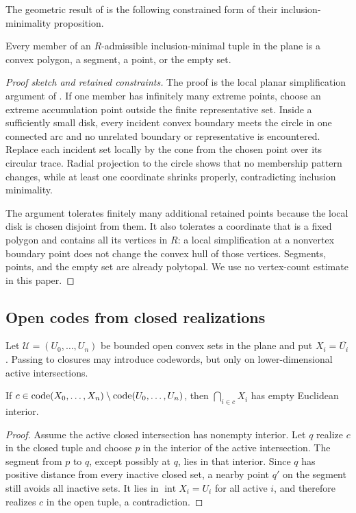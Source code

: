 The geometric result of \citet{BukhJeffs2023} is the following constrained
form of their inclusion-minimality proposition.

\begin{lemma}\label{lem:polygonal}
Every member of an $R$-admissible inclusion-minimal tuple in the plane is a
convex polygon, a segment, a point, or the empty set.
\end{lemma}

\begin{proof}[Proof sketch and retained constraints]
The proof is the local planar simplification argument of
\citet{BukhJeffs2023}.  If one member has infinitely many extreme points,
choose an extreme accumulation point outside the finite representative set.
Inside a sufficiently small disk, every incident convex boundary meets the
circle in one connected arc and no unrelated boundary or representative is
encountered.  Replace each incident set locally by the cone from the chosen
point over its circular trace.  Radial projection to the circle shows that
no membership pattern changes, while at least one coordinate shrinks
properly, contradicting inclusion minimality.

The argument tolerates finitely many additional retained points because the
local disk is chosen disjoint from them.  It also tolerates a coordinate
that is a fixed polygon and contains all its vertices in $R$: a local
simplification at a nonvertex boundary point does not change the convex hull
of those vertices.  Segments, points, and the empty set are already
polytopal.  We use no vertex-count estimate in this paper.
\end{proof}

\subsection{Open codes from closed realizations}

Let $\mathcal U=(U_0,\ldots,U_n)$ be bounded open convex sets in the plane
and put $X_i=\overline{U_i}$.  Passing to closures may introduce codewords,
but only on lower-dimensional active intersections.

\begin{lemma}\label{lem:closureonly}
If
$c\in\operatorname{code}(X_0,\ldots,X_n)\setminus\operatorname{code}(U_0,\ldots,U_n)$, then
$\bigcap_{i\in c}X_i$ has empty Euclidean interior.
\end{lemma}

\begin{proof}
Assume the active closed intersection has nonempty interior.  Let $q$ realize
$c$ in the closed tuple and choose $p$ in the interior of the active
intersection.  The segment from $p$ to $q$, except possibly at $q$, lies in
that interior.  Since $q$ has positive distance from every inactive closed
set, a nearby point $q'$ on the segment still avoids all inactive sets.  It
lies in $\operatorname{int}X_i=U_i$ for all active $i$, and therefore
realizes $c$ in the open tuple, a contradiction.
\end{proof}

